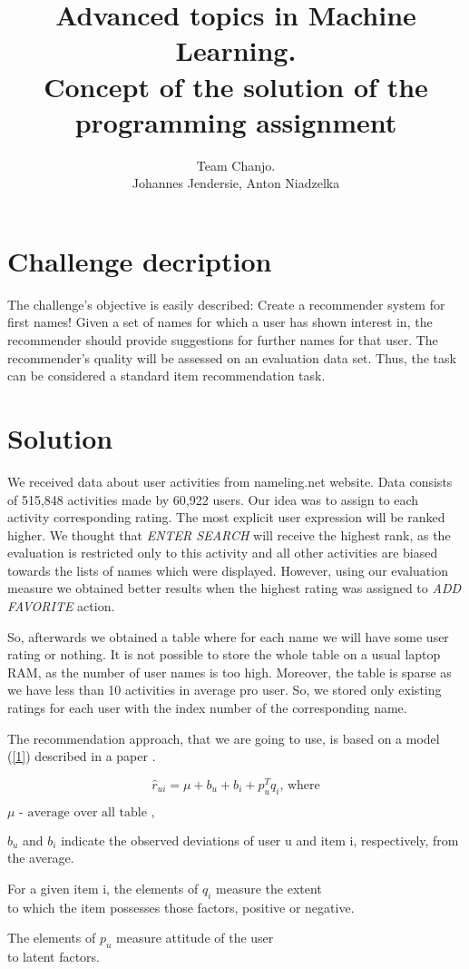 \documentclass[pdftex,a4paper,11pt]{article}
\title{Advanced topics in Machine Learning. \\ Concept of the solution of the programming assignment}
\author{ Team Chanjo. \\ Johannes Jendersie, Anton Niadzelka }
\begin{document}
\maketitle

\section{Challenge decription}
The challenge’s objective is easily described: Create a recommender system for first names! Given a set of names for which a user has shown interest in, the recommender should provide suggestions for further names for that user. The recommender’s quality will be assessed on an evaluation data set. Thus, the task can be considered a standard item recommendation task.

\section{Solution}

We received data about user activities from nameling.net website. Data consists of 515,848 activities made by 60,922 users. Our idea was to assign to each activity corresponding rating. The most explicit user expression will be ranked higher. We thought that \textit{ENTER SEARCH} will receive the highest rank, as  the evaluation is restricted only to this activity and all other activities are biased towards the lists of names which were displayed. However, using our evaluation measure we obtained better results when the highest rating was assigned to \textit{ADD FAVORITE} action. 


So, afterwards we obtained a table where for each name we will have some user rating or nothing. It is not possible to store the whole table on a usual laptop RAM, as the number of user names is too high. Moreover, the table is sparse as we have less than 10 activities in average pro user. So, we stored only existing ratings for each user with the index number of the corresponding name.

The recommendation approach, that we are going to use, is based on a model (\ref{1}) described in a paper \cite{2}. 

\begin{equation} \label{1} \hat{r}_{u i} = \mu + b_u + b_i + p^T _u q_i   \text{, where} \end{equation}
\begin{center} $  \mu \text{ - average over all table  ,}  $ \end{center}
\begin{center} $ b_u $ and $ b_i $ indicate the observed deviations of user u and item i, respectively, from the average.
 \end{center}
\begin{center} For a given item i, the elements of $ q_i $ measure the extent \\ to which the item possesses those factors, positive or negative. \end{center}
\begin{center} The elements of $ p_u $ measure attitude of the user \\ to latent factors. \end{center}
\end{document}
